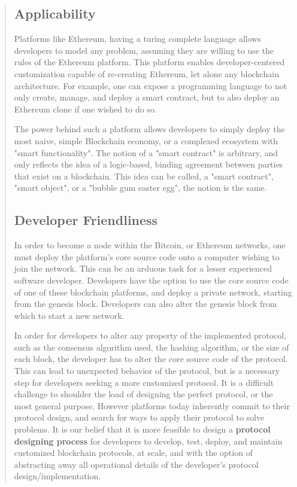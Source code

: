 \documentclass[12pt, titlepage, twocolumn]{report}
\begin{document}
\begin{quotation}
\subsection{Applicability}
Platforms like Ethereum, having a turing complete language allows developers to model any problem, assuming they are willing to use the rules of the Ethereum platform. This platform enables developer-centered customization capable of re-creating Ethereum, let alone any blockchain architecture. For example, one can expose a programming language to not only create, manage, and deploy a smart contract, but to also deploy an Ethereum clone if one wished to do so.
 
The power behind such a platform allows developers to simply deploy the most naive, simple Blockchain economy, or a complexed ecosystem with "smart functionality". The notion of a "smart contract" is arbitrary, and only reflects the idea of a logic-based, binding agreement between parties that exist on a blockchain. This idea can be called, a "smart contract", "smart object", or a "bubble gum easter egg", the notion is the same.


\subsection{Developer Friendliness}
In order to become a node within the Bitcoin, or Ethereum networks, one must deploy the platform's core source code onto a computer wishing to join the network. This can be an arduous task for a lesser experienced software developer. Developers have the option to use the core source code of one of these blockchain platforms, and deploy a private network, starting from the genesis block. Developers can also alter the genesis block from which to start a new network.

In order for developers to alter any property of the implemented protocol, such as the consensus algorithm used, the hashing algorithm, or the size of each block, the developer has to alter the core source code of the protocol. This can lead to unexpected behavior of the protocol, but is a necessary step for developers seeking a more customized protocol. It is a difficult challenge to shoulder the load of designing the perfect protocol, or the most general purpose. However platforms today inherently commit to their protocol design, and search for ways to apply their protocol to solve problems. It is our belief that it is more feasible to design a \textbf{protocol designing process} for developers to develop, test, deploy, and maintain customized blockchain protocols, at scale, and with the option of abstracting away all operational details of the developer's protocol design/implementation.


\end{quotation}
\end{document}
